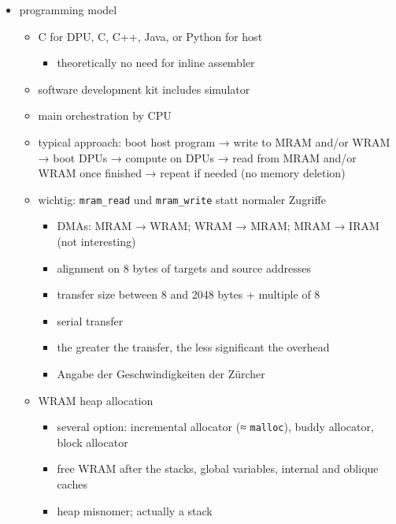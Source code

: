 \begin{itemize}
	\item
	programming model
	\begin{itemize}
		\item
		C for DPU, C, C++, Java, or Python for host
		\begin{itemize}
			\item
			theoretically no need for inline assembler
		\end{itemize}

		\item
		software development kit includes simulator

		\item
		main orchestration by CPU

		\item
		typical approach:
		boot host program → write to MRAM and/or WRAM → boot DPUs → compute on DPUs → read from MRAM and/or WRAM once finished → repeat if needed (no memory deletion)

		\item
		wichtig:
		\lstinline|mram_read| und \lstinline|mram_write| statt normaler Zugriffe
		\begin{itemize}
			\item
			DMAs:
			MRAM → WRAM;
			WRAM → MRAM;
			MRAM → IRAM (not interesting)

			\item
			alignment on 8 bytes of targets and source addresses

			\item
			transfer size between 8 and 2048 bytes + multiple of 8

			\item
			serial transfer

			\item
			the greater the transfer, the less significant the overhead

			\item
			Angabe der Geschwindigkeiten der Zürcher
		\end{itemize}

		\item
		WRAM heap allocation
		\begin{itemize}
			\item
			several option:
			incremental allocator (≈ \lstinline|malloc|), buddy allocator, block allocator

			\item
			free WRAM after the stacks, global variables, internal and oblique caches

			\item
			heap misnomer;
			actually a stack


\end{itemize}
\end{itemize}
\end{itemize}
